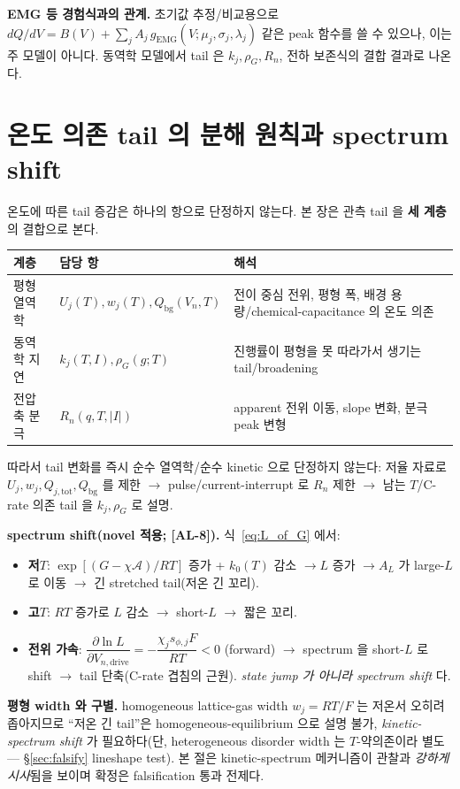 \documentclass[11pt,a4paper]{article}
\newcommand{\drive}{\mathrm{drive}}
\newcommand{\tot}{\mathrm{tot}}
\newcommand{\bg}{\mathrm{bg}}
\newcommand{\AL}[1]{\textsf{[AL-#1]}}
\begin{document}
\textbf{EMG 등 경험식과의 관계.} 초기값 추정/비교용으로
$dQ/dV=B(V)+\sum_j A_j\,g_\mathrm{EMG}(V;\mu_j,\sigma_j,\lambda_j)$ 같은 peak 함수를 쓸 수 있으나, 이는
주 모델이 아니다. 동역학 모델에서 tail 은 $k_j,\rho_G,R_n$, 전하 보존식의 결합 결과로 나온다.

\section{온도 의존 tail 의 분해 원칙과 spectrum shift}\label{sec:tailT}
온도에 따른 tail 증감은 하나의 항으로 단정하지 않는다. 본 장은 관측 tail 을 \textbf{세 계층}의 결합으로 본다.
\begin{longtable}{p{} p{} p{}}
\toprule 계층 & 담당 항 & 해석 \\ \midrule \endhead
평형 열역학 & $U_j(T),w_j(T),Q_\bg(V_n,T)$ & 전이 중심 전위, 평형 폭, 배경 용량/chemical-capacitance 의 온도 의존 \\
동역학 지연 & $k_j(T,I),\rho_G(g;T)$ & 진행률이 평형을 못 따라가서 생기는 tail/broadening \\
전압축 분극 & $R_n(q,T,|I|)$ & apparent 전위 이동, slope 변화, 분극 peak 변형 \\
\bottomrule
\end{longtable}
따라서 tail 변화를 즉시 순수 열역학/순수 kinetic 으로 단정하지 않는다: 저율 자료로 $U_j,w_j,Q_{j,\tot},Q_\bg$
를 제한 $\to$ pulse/current-interrupt 로 $R_n$ 제한 $\to$ 남는 $T$/C-rate 의존 tail 을 $k_j,\rho_G$ 로 설명.

\textbf{spectrum shift(novel 적용; \AL{8}).} 식~\eqref{eq:L_of_G} 에서:
\begin{itemize}[leftmargin=1.4em]
\item \textbf{저$T$}: $\exp[(G-\chi\mathcal A)/RT]$ 증가 + $k_0(T)$ 감소 $\to L$ 증가 $\to A_L$ 가 large-$L$
  로 이동 $\to$ 긴 stretched tail(저온 긴 꼬리).
\item \textbf{고$T$}: $RT$ 증가로 $L$ 감소 $\to$ short-$L$ $\to$ 짧은 꼬리.
\item \textbf{전위 가속}: $\dfrac{\partial\ln L}{\partial V_{n,\drive}}=-\dfrac{\chi_j s_{\phi,j}F}{RT}<0$
  (forward) $\to$ spectrum 을 short-$L$ 로 shift $\to$ tail 단축(C-rate 겹침의 근원). \emph{state jump 가
  아니라 spectrum shift} 다.
\end{itemize}
\textbf{평형 width 와 구별.} homogeneous lattice-gas width $w_j=RT/F$ 는 저온서 오히려 좁아지므로 ``저온
긴 tail''은 homogeneous-equilibrium 으로 설명 불가, \emph{kinetic-spectrum shift} 가 필요하다(단,
heterogeneous disorder width 는 $T$-약의존이라 별도 — \S\ref{sec:falsify} lineshape test). 본 절은
kinetic-spectrum 메커니즘이 관찰과 \emph{강하게 시사}됨을 보이며 확정은 falsification 통과 전제다.
\end{document}
